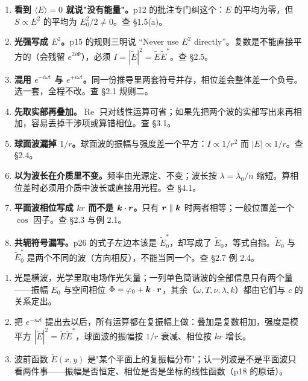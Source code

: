 \documentclass[10pt]{ctexart}
\newcommand{\Etil}{\tilde{E}}
\newcommand{\Ez}{\tilde{E}_0}
\begin{document}

\begin{enumerate}[label=\textbf{(\arabic*)}]
\item \textbf{看到 $\langle E\rangle=0$ 就说"没有能量"。}p12 的批注专门纠这个：$E$ 的平均为零，但 $S\propto E^2$ 的平均为 $E_0^2/2\ne0$。查 §1.5(a)。
\item \textbf{光强写成 $E^2$。}p15 的规则三明说 “Never use $E^2$ directly”。复数是不能直接平方的（会残留 $e^{2i\Phi}$），必须 $I=|\Etil|^2=\Etil\Etil^{*}$。查 §2.5。
\item \textbf{混用 $e^{-i\omega t}$ 与 $e^{+i\omega t}$。}同一份推导里两套符号并存，相位差会整体差一个负号。选一套，全程不改。查 §2.1 规则二。
\item \textbf{先取实部再叠加。}$\operatorname{Re}$ 只对线性运算可省；如果先把两个波的实部写出来再相加，容易丢掉干涉项或算错相位。查 §3.1。
\item \textbf{球面波漏掉 $1/r$。}球面波的振幅与强度差一个平方：$I\propto1/r^2$ 而 $|E|\propto1/r$。查 §2.4。
\item \textbf{以为波长在介质里不变。}频率由光源定、不变；波长按 $\lambda=\lambda_0/n$ 缩短。算相位差时必须用介质中波长或直接用光程。查 §4.1。
\item \textbf{平面波相位写成 $kr$ 而不是 $\boldsymbol{k}\cdot\boldsymbol{r}$。}只有 $\boldsymbol{r}\parallel\boldsymbol{k}$ 时两者相等；一般位置差一个 $\cos$ 因子。查 §2.3 与例 2.1。
\item \textbf{共轭符号漏写。}p26 的式子左边本该是 $\Ez^{*}$，却写成了 $\Ez$，等式自指。$\Ez$ 与 $\Ez^{*}$ 是两个不同的波（方向相反），不能当同一个。查 §2.7 例 2.4。
\end{enumerate}


\begin{enumerate}[label=\textbf{\arabic*.}]
\item 光是横波，光学里取电场作光矢量；一列单色简谐波的全部信息只有两个量——振幅 $E_0$ 与空间相位 $\Phi=\varphi_0+\boldsymbol{k}\cdot\boldsymbol{r}$，其余（$\omega,T,\nu,\lambda,k$）都由它们与 $c$ 的关系定出。
\item 把 $e^{-i\omega t}$ 提出去以后，所有运算都在复振幅上做：叠加是复数相加，强度是模平方 $|\Etil|^2=\Etil\Etil^{*}$，球面波的振幅按 $1/r$ 衰减、相位按 $kr$ 增长。
\item 波前函数 $\Etil(x,y)$ 是"某个平面上的复振幅分布"；认一列波是不是平面波只看两件事——振幅是否恒定、相位是否是坐标的线性函数（p18 的原话）。
\end{enumerate}
\end{document}
